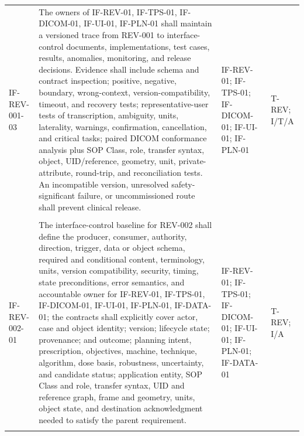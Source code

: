 \documentclass[11pt,letterpaper]{article}
\begin{document}
\begin{scriptsize}
\begin{longtable}{@{}L{0.14\textwidth}L{0.49\textwidth}L{0.19\textwidth}L{0.10\textwidth}@{}}
\addlinespace[2pt]
\mbox{IF-REV-001-03} & The owners of IF-REV-01, IF-TPS-01, IF-DICOM-01, IF-UI-01, IF-PLN-01 shall maintain a versioned trace from REV-001 to interface-control documents, implementations, test cases, results, anomalies, monitoring, and release decisions. Evidence shall include schema and contract inspection; positive, negative, boundary, wrong-context, version-compatibility, timeout, and recovery tests; representative-user tests of transcription, ambiguity, units, laterality, warnings, confirmation, cancellation, and critical tasks; paired DICOM conformance analysis plus SOP Class, role, transfer syntax, object, UID\slash\allowbreak{}reference, geometry, unit, private-attribute, round-trip, and reconciliation tests. An incompatible version, unresolved safety-significant failure, or uncommissioned route shall prevent clinical release. & IF-REV-01; IF-TPS-01; IF-DICOM-01; IF-UI-01; IF-PLN-01 & T-REV; I\slash\allowbreak{}T\slash\allowbreak{}A \\
\addlinespace[2pt]
 \\
\addlinespace[2pt]
\mbox{IF-REV-002-01} & The interface-control baseline for REV-002 shall define the producer, consumer, authority, direction, trigger, data or object schema, required and conditional content, terminology, units, version compatibility, security, timing, state preconditions, error semantics, and accountable owner for IF-REV-01, IF-TPS-01, IF-DICOM-01, IF-UI-01, IF-PLN-01, IF-DATA-01; the contracts shall explicitly cover actor, case and object identity; version; lifecycle state; provenance; and outcome; planning intent, prescription, objectives, machine, technique, algorithm, dose basis, robustness, uncertainty, and candidate status; application entity, SOP Class and role, transfer syntax, UID and reference graph, frame and geometry, units, object state, and destination acknowledgment needed to satisfy the parent requirement. & IF-REV-01; IF-TPS-01; IF-DICOM-01; IF-UI-01; IF-PLN-01; IF-DATA-01 & T-REV; I\slash\allowbreak{}A \\
\addlinespace[2pt]

\end{longtable}
\end{scriptsize}
\end{document}

